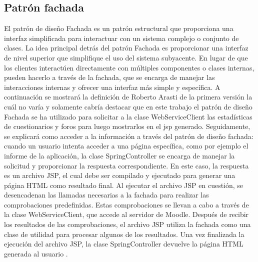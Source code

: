 \subsection{Patrón fachada}
El patrón de diseño Fachada es un patrón estructural que proporciona una interfaz simplificada para interactuar con un sistema complejo o conjunto de clases. La idea principal detrás del patrón Fachada es proporcionar una interfaz de nivel superior que simplifique el uso del sistema subyacente. En lugar de que los clientes interactúen directamente con múltiples componentes o clases internas, pueden hacerlo a través de la fachada, que se encarga de manejar las interacciones internas y ofrecer una interfaz más simple y específica.
A continuación se mostrará la definición de Roberto Arasti de la primera versión la cuál no varía y solamente cabría destacar que en este trabajo el patrón de diseño Fachada se ha utilizado para solicitar a la clase WebServiceClient las estadísticas de cuestionarios y foros para luego mostrarlos en el jsp generado.
Seguidamente, se explicará como acceder a la información a través del patrón de diseño fachada:
cuando un usuario intenta acceder a una página específica, como por ejemplo el informe de la aplicación, la clase SpringController se encarga de manejar la solicitud y proporcionar la respuesta correspondiente. En este caso, la respuesta es un archivo JSP, el cual debe ser compilado y ejecutado para generar una página HTML como resultado final. Al ejecutar el archivo JSP en cuestión, se desencadenan las llamadas necesarias a la fachada para realizar las comprobaciones predefinidas. Estas comprobaciones se llevan a cabo a través de la clase WebServiceClient, que accede al servidor de Moodle. Después de recibir los resultados de las comprobaciones, el archivo JSP utiliza la fachada como una clase de utilidad para procesar algunos de los resultados. Una vez finalizada la ejecución del archivo JSP, la clase SpringController devuelve la página HTML generada al usuario \cite{previotfganexos}.
